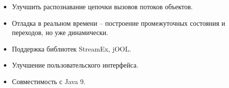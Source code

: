 \begin{frame}
\frametitle{\insertsection} 
\framesubtitle{\insertsubsection}
\begin{itemize}
	\item Улучшить распознавание цепочки вызовов потоков объектов.
	\item Отладка в реальном времени -- построение промежуточных состояния и переходов, но уже динамически.
	\item Поддержка библиотек StreamEx, jOOL.
	\item Улучшение пользовательского интерфейса.
	\item Совместимость с Java 9.
\end{itemize}
\end{frame}
